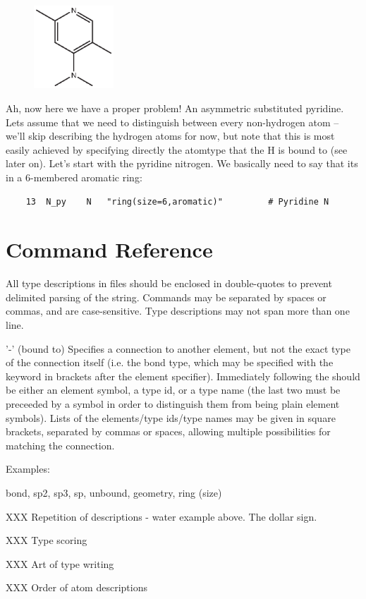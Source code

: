 \begin{figure} \includegraphics[width=3cm]{figures/aromatic.eps} \end{figure}
Ah, now here we have a proper problem! An asymmetric substituted pyridine. Lets assume that we need to distinguish between every non-hydrogen atom  -- we'll skip describing the hydrogen atoms for now, but note that this is most easily achieved by specifying directly the atomtype that the H is bound to (see later on). Let's start with the pyridine nitrogen. We basically need to say that its in a 6-membered aromatic ring:

\begin{verbatim}
    13	N_py	N	"ring(size=6,aromatic)"			# Pyridine N
\end{verbatim}


\section{Command Reference}
\label{sec:typingcommands}

All type descriptions in files should be enclosed in double-quotes to prevent delimited parsing of the string. Commands may be separated by spaces or commas, and are case-sensitive. Type descriptions may not span more than one line.

'-' (bound to)
Specifies a connection to another element, but not the exact type of the connection itself (i.e. the bond type, which may be specified with the  keyword in brackets after the element specifier). Immediately following the \qte{--} should be either an element symbol, a type id, or a type name (the last two must be preceeded by a \qte{\$} symbol in order to distinguish them from being plain element symbols). Lists of the elements/type ids/type names may be given in square brackets, separated by commas or spaces, allowing multiple possibilities for matching the connection.

Examples:



bond, sp2, sp3, sp, unbound, geometry, ring (size)


XXX Repetition of descriptions - water example above. The dollar sign.

XXX Type scoring

XXX Art of type writing

XXX Order of atom descriptions


